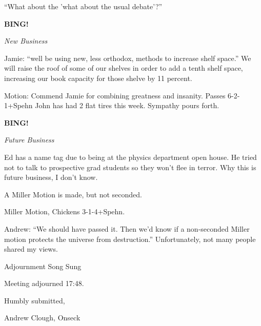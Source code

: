 \documentclass[12pt]{article}
\newcommand{\bing}{{\bf BING!} }
\newcommand{\goto}[1]{\bing \vskip 12pt \centerline{{\em{#1}}}}
\begin{document}
``What about the 'what about the usual debate'?''

\goto{New Business}

Jamie:  ``well be using new, less orthodox, methods to increase shelf space.''  We will raise the roof of some of our shelves in order to add a tenth shelf space, increasing our book capacity for those shelve by 11 percent.  

Motion:  Commend Jamie for combining greatness and insanity.  Passes 6-2-1+Spehn
John has had 2 flat tires this week.  Sympathy pours forth.

\goto{Future Business}

Ed has a name tag due to being at the physics department open house.  He tried not to talk to prospective grad students so they won't flee in terror.  Why this is future business, I don't know.

A Miller Motion is made, but not seconded.

Miller Motion, Chickens 3-1-4+Spehn.

Andrew:  ``We should have passed it.  Then we'd know if a non-seconded Miller motion protects the universe from destruction.''  Unfortunately, not many people shared my views.

Adjournment Song Sung

\vspace{12pt}

\noindent
Meeting adjourned 17:48.

\vspace{18pt}

\centerline{Humbly submitted,}
\centerline{Andrew Clough, Onseck}
\end{document}
